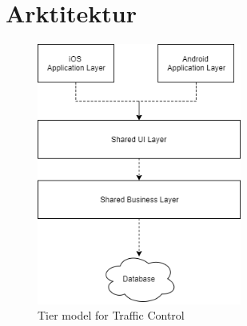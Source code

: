 \chapter{Arktitektur}



\begin{figure}[htbp] %
	\centering
	\includegraphics[width=0.6\textwidth]{../ArkitekturDesign/OverordnetArkitektur/SystemArkitektur.png}
	\caption{Tier model for Traffic Control}
	\label{fig:TierModel}
\end{figure}
\clearpage

